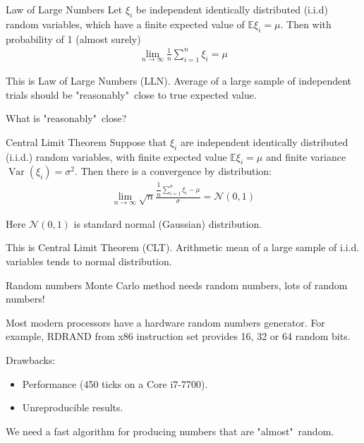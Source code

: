 \documentclass{beamer}
\begin{document}
\begin{frame}{Law of Large Numbers}
\justify
Let  $\xi_i$ be independent identically distributed (i.i.d) random variables, which have a finite expected value of $\mathbb{E}\xi_i=\mu$. Then with probability of 1 (almost surely)
\begin{align*}
\lim_{n \to \infty} \frac{1}{n} \sum\limits_{i=1}^{n}\xi_i = \mu
\end{align*}

\justify
This is \alert{Law of Large Numbers} (LLN). Average of a large sample of independent trials should be "reasonably"\ close to true expected value.

\justify
What is "reasonably"\ close?
\end{frame}



\begin{frame}{Central Limit Theorem}
\justify
Suppose that $\xi_i$ are independent identically distributed (i.i.d.) random variables, with finite expected value $\mathbb{E}\xi_i=\mu$ and finite variance $\operatorname{Var}(\xi_i) = \sigma^2$. Then there is a convergence by distribution:
\begin{align*}
\lim_{n \to \infty} \sqrt{n}\frac{\dfrac{1}{n}\sum\limits_{i=1}^{n}\xi_i - \mu}{\sigma} = \mathcal{N}(0, 1)
\end{align*}

\justify
Here $\mathcal{N}(0, 1)$ is standard normal (Gaussian) distribution.

\justify
This is \alert{Central Limit Theorem} (CLT). Arithmetic mean of a large sample of i.i.d. variables tends to normal distribution.
\end{frame}




\begin{frame}{Random numbers}
\justify
Monte Carlo method needs random numbers, lots of random numbers!

\justify
Most modern processors have a hardware random numbers generator. For example, RDRAND from x86 instruction set provides 16, 32 or 64 random bits.

\justify
Drawbacks:
\begin{itemize}
\item Performance (450 ticks on a Core i7-7700).
\item Unreproducible results.
\end{itemize}

\justify
We need a fast algorithm for producing numbers that are "almost"\ random.
\end{frame}
\end{document}

